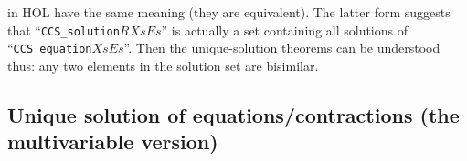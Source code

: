 \documentclass[GCNS]{yincog}
\renewcommand{\HOLinline}[1]{\mbox{\textup{\texttt{#1}}}}
\renewcommand{\HOLConst}[1]{\texttt{#1}}
\renewcommand{\HOLFreeVar}[1]{\ensuremath{\mathit{#1}}}
\theoremstyle{remark}
\theoremstyle{theorem}
\theoremstyle{remark}
\newcommand{\multivariate}{multivariable\xspace}
\begin{document}
in HOL have the same meaning (they are equivalent). The latter form suggests
that ``\HOLinline{\HOLConst{CCS\_solution}\\\;\HOLFreeVar{R}\\\;\HOLFreeVar{Xs}\\\;\HOLFreeVar{Es}}''
is actually a set containing all solutions of ``\HOLinline{\HOLConst{CCS\_equation}\\\;\HOLFreeVar{Xs}\\\;\HOLFreeVar{Es}}''.
Then the unique-solution theorems can be understood thus: any two elements
in the solution set are bisimilar.

\subsection{Unique solution of equations/contractions (the \multivariate version)}
 \label{sec5.5}
\end{document}
